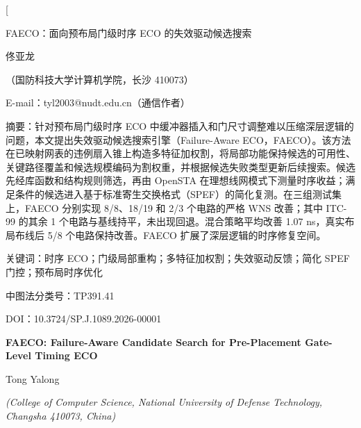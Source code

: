 \documentclass[twocolumn,10pt,fontset=windows]{ctexart}
\let\songti\songfamily\let\heiti\heifamily\let\fangsong\fangfamily
\begin{document}
\pagestyle{plain}

\twocolumn[
\vspace*{-0.25cm}
\begin{center}
{\heiti{} FAECO：面向预布局门级时序 ECO 的失效驱动候选搜索}\par
\vspace{6pt}
{\fangsong{} 佟亚龙}\par
\vspace{4pt}
{\songti\fontsize{8}{12}\selectfont（国防科技大学计算机学院，长沙 410073）}\par\vspace{2pt}
{\songti\fontsize{8}{12}\selectfont E-mail：tyl2003@nudt.edu.cn（通信作者）}\par
\vspace{6pt}
\end{center}
\begin{flushleft}
  {\heiti\fontsize{8.5}{13}\selectfont 摘\quad 要：}{\songti\fontsize{8.5}{13}\selectfont 针对预布局门级时序 ECO 中缓冲器插入和门尺寸调整难以压缩深层逻辑的问题，本文提出失效驱动候选搜索引擎（Failure-Aware ECO，FAECO）。该方法在已映射网表的违例扇入锥上构造多特征加权割，将局部功能保持候选的可用性、关键路径覆盖和候选规模编码为割权重，并根据候选失败类型更新后续搜索。候选先经库函数和结构规则筛选，再由 OpenSTA 在理想线网模式下测量时序收益；满足条件的候选进入基于标准寄生交换格式（SPEF）的简化复测。在三组测试集上，FAECO 分别实现 8/8、18/19 和 2/3 个电路的严格 WNS 改善；其中 ITC-99 的其余 1 个电路与基线持平，未出现回退。混合策略平均改善 1.07 ns，真实布局布线后 5/8 个电路保持改善。FAECO 扩展了深层逻辑的时序修复空间。}
\par
\vspace{4pt}
{\heiti\fontsize{8.5}{13}\selectfont 关键词：}{\songti\fontsize{8.5}{13}\selectfont 时序 ECO；门级局部重构；多特征加权割；失效驱动反馈；简化 SPEF 门控；预布局时序优化}\par
\vspace{2pt}
{\songti\fontsize{8.5}{13}\selectfont 中图法分类号：TP391.41}\par
\vspace{2pt}
{\songti\fontsize{8.5}{13}\selectfont DOI：10.3724/SP.J.1089.2026-00001}
\end{flushleft}
\vspace{4pt}
\begin{center}
{\bfseries\fontsize{13.5}{18}\selectfont FAECO: Failure-Aware Candidate Search for Pre-Placement Gate-Level Timing ECO}\par
\vspace{3pt}
{\normalsize Tong Yalong\par}
\vspace{3pt}
{\small \itshape (College of Computer Science, National University of Defense Technology, Changsha 410073, China)}\par
\vspace{4pt}
\end{center}
\end{document}
